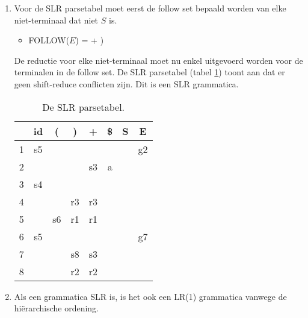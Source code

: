 \documentclass{report}
\begin{document}
{\begin{enumerate}
			\item Voor de SLR parsetabel moet eerst de follow set bepaald worden van elke niet-terminaal dat niet $S$ is.
			\begin{itemize}
				\item FOLLOW($E$) = + )
			\end{itemize}
			De reductie voor elke niet-terminaal moet nu enkel uitgevoerd worden voor de terminalen in de follow set. De SLR parsetabel (tabel \ref{SLRPARSETABEL}) toont aan dat er geen shift-reduce conflicten zijn. Dit is een SLR grammatica.
			\begin{table}[ht]
				\centering
				\begin{tabular}{c|ccccc|cc|}
					& id & ( & ) & + & \$ & S & E \\
					\hline 
					1 & s5 & & & & & & g2 \\
					2 & & & & s3 & a & & \\
					3 & s4 & & & & & & \\
					4 & & & r3 & r3 & & & \\
					5 & & s6 & r1 & r1 & & & \\
					6 & s5 & & & & & & g7 \\
					7 & & & s8 & s3 & & & \\
					8 & & & r2 & r2 & & & \\
					\hline
				\end{tabular}
				\caption{De SLR parsetabel.}
				\label{SLRPARSETABEL}
			\end{table}
			
			\item Als een grammatica SLR is, is het ook een LR(1) grammatica vanwege de hiërarchische ordening.  
			
		\end{enumerate}

	}
\end{document}
